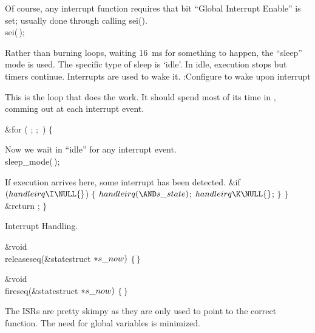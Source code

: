 Of course, any interrupt function requires that bit ``Global Interrupt Enable''
is set; usually done through calling sei().
\Y\B\\{sei}(\,);\par
\fi

Rather than burning loops, waiting 16~ms for something to happen,
the ``sleep'' mode is used.
The specific type of sleep is `idle'.
In idle, execution stops but timers continue.
Interrupts are used to wake it.
\Y\B{}:Configure to wake upon interrupt\X\par
\fi

This is the loop that does the work.
It should spend most of its time in ,
comming out at each interrupt event.

\Y\B\&{for} ( ;  ; \,) $\{{}$\Y\par
\fi

Now we wait in ``idle'' for any interrupt event.
\Y\B\\{sleep\_mode}(\,);\par
\fi

If execution arrives here, some interrupt has been detected.
\Y\B\&{if} ${}(\\{handleirq}\I\NULL{}$)\6
${}\{{}$\1\7
${}\\{handleirq}({\AND}\\{s\_state}){}$;\6
${}\\{handleirq}\K\NULL{}$;\6
\4${}\}{}$\2\7
$\}{}$\7
\&{return} ;\7
$\}{}$\par
\fi

Interrupt Handling.

\Y\B\&{void} \\{releaseseq}(\&{statestruct} ${}{*}\\{s\_now}){}$\1\1\2\2\6
${}\{\,\}{}$\par
\fi



\Y\B\&{void} \\{fireseq}(\&{statestruct} ${}{*}\\{s\_now}){}$\1\1\2\2\6
${}\{\,\}{}$\par
\fi

The ISRs are pretty skimpy as they are only used to point  to
the correct function.
The need for global variables is minimized.


